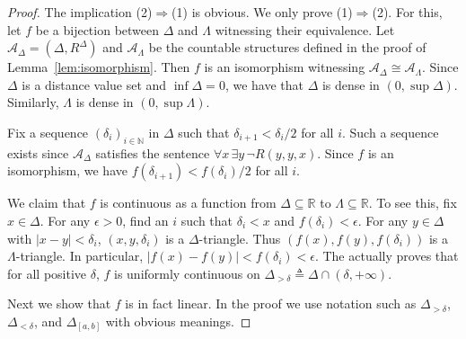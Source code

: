 \documentclass{amsart}
\theoremstyle{definition}
\theoremstyle{remark}
\begin{document}
\begin{proof} The implication (2)$\Rightarrow$(1) is obvious. We only prove (1)$\Rightarrow$(2). For this, let $f$ be a bijection between $\Delta$ and $\Lambda$ witnessing their equivalence. Let $\mathcal{A}_\Delta=(\Delta, R^\Delta)$ and $\mathcal{A}_\Lambda$ be the countable structures defined in the proof of Lemma~\ref{lem:isomorphism}. Then $f$ is an isomorphism witnessing $\mathcal{A}_\Delta\cong \mathcal{A}_\Lambda$. Since $\Delta$ is a distance value set and $\inf\Delta=0$, we have that $\Delta$ is dense in $(0, \sup\Delta)$. Similarly, $\Lambda$ is dense in $(0, \sup\Lambda)$.

Fix a sequence $(\delta_i)_{i\in\mathbb{N}}$ in $\Delta$ such that $\delta_{i+1} < {\delta_i}/{2}$ for all $i$. Such a sequence exists since $\mathcal{A}_\Delta$ satisfies the sentence $\forall x\,\exists y\,\neg R(y,y,x)$. Since $f$ is an isomorphism, we have $f(\delta_{i+1})<{f(\delta_i)}/{2}$ for all $i$. 

We claim that $f$ is continuous as a function from $\Delta\subseteq\mathbb{R}$ to $\Lambda\subseteq\mathbb{R}$. To see this,  
fix $x \in \Delta$. For any $\epsilon > 0$, find an $i$ such that $\delta_i < x$ and $f(\delta_i) < \epsilon$. For any $y \in \Delta$ with $|x - y| < \delta_i$, $(x,y,\delta_i)$ is a $\Delta$-triangle. Thus $(f(x), f(y),f(\delta_i))$ is a $\Lambda$-triangle. In particular, $|f(x)-f(y)|<f(\delta_i)<\epsilon$. The actually proves that for all positive $\delta$, $f$ is uniformly continuous on $\Delta_{>\delta}\triangleq \Delta\cap (\delta,+\infty)$. 

Next we show that $f$ is in fact linear. In the proof we use notation such as $\Delta_{>\delta}$, $\Delta_{<\delta}$, and $\Delta_{[a,b]}$ with obvious meanings.

     
   

\end{proof}
\end{document}
